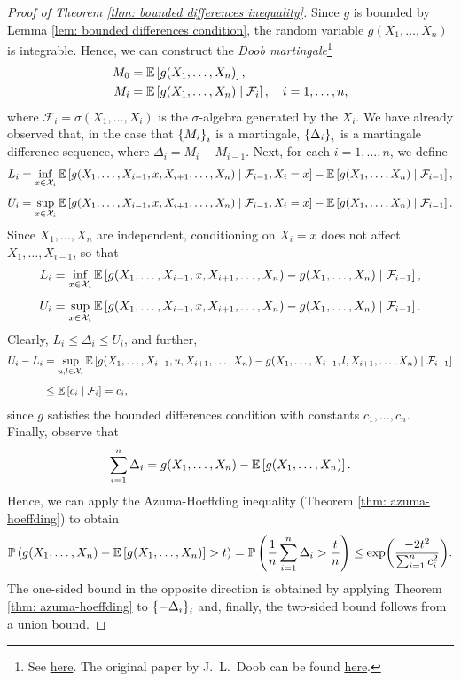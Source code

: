 \begin{proof}[Proof of Theorem \ref{thm: bounded differences inequality}]
Since $g$ is bounded by Lemma \ref{lem: bounded differences condition}, the random variable $g(X_1, \dots, X_n)$ is integrable. Hence, we can construct the \emph{Doob martingale}\footnote{See \href{https://en.wikipedia.org/wiki/Doob_martingale}{here}. The original paper by J.~L.~Doob can be found \href{https://www.ams.org/journals/tran/1940-047-03/S0002-9947-1940-0002052-6/S0002-9947-1940-0002052-6.pdf}{here}.}
\begin{align*}
    M_0 &= \mathbb{E}\left[g(X_1, \dots, X_n)\right], \\
    M_i &= \mathbb{E}\left[g(X_1, \dots, X_n) \mathrel{|} \mathcal{F}_i\right], \quad i = 1, \dots, n,
\end{align*}
where $\mathcal{F}_i = \sigma(X_1, \dots, X_i)$ is the $\sigma$-algebra generated by the $X_i$. We have already observed that, in the case that $\left\{M_i\right\}_i$ is a martingale, $\left\{\Delta_i\right\}_i$ is a martingale difference sequence, where $\Delta_i = M_i - M_{i-1}$. Next, for each $i = 1, \dots, n$, we define
\begin{align*}
    L_i &= \inf_{x \in \mathcal{X}_i} \mathbb{E}\left[g(X_1, \dots, X_{i-1}, x, X_{i+1}, \dots, X_n) \mathrel{|} \mathcal{F}_{i-1}, X_i = x\right] - \mathbb{E}\left[g(X_1, \dots, X_n) \mathrel{|} \mathcal{F}_{i-1}\right], \\[4pt]
    U_i &= \sup_{x \in \mathcal{X}_i} \mathbb{E}\left[g(X_1, \dots, X_{i-1}, x, X_{i+1}, \dots, X_n) \mathrel{|} \mathcal{F}_{i-1}, X_i = x\right] - \mathbb{E}\left[g(X_1, \dots, X_n) \mathrel{|} \mathcal{F}_{i-1}\right].
\end{align*}
Since $X_1, \dots, X_n$ are independent, conditioning on $X_i = x$ does not affect $X_1, \dots, X_{i-1}$, so that
\begin{align*}
    L_i &= \inf_{x \in \mathcal{X}_i} \mathbb{E}\left[g(X_1, \dots, X_{i-1}, x, X_{i+1}, \dots, X_n) - g(X_1, \dots, X_n) \mathrel{|} \mathcal{F}_{i-1}\right], \\[4pt]
    U_i &= \sup_{x \in \mathcal{X}_i} \mathbb{E}\left[g(X_1, \dots, X_{i-1}, x, X_{i+1}, \dots, X_n) - g(X_1, \dots, X_n) \mathrel{|} \mathcal{F}_{i-1}\right].
\end{align*}
Clearly, $L_i \leq \Delta_i \leq U_i$, and further,
\begin{align*}
    U_i - L_i &= \sup_{u, l \in \mathcal{X}_i} \mathbb{E}\left[g(X_1, \dots, X_{i-1}, u, X_{i+1}, \dots, X_n) - g(X_1, \dots, X_{i-1}, l, X_{i+1}, \dots, X_n) \mathrel{|} \mathcal{F}_{i-1}\right] \\[4pt]
        &\leq \mathbb{E}\left[c_i \mathrel{|} \mathcal{F}_i\right] = c_i,
\end{align*}
since $g$ satisfies the bounded differences condition with constants $c_1, \dots, c_n$. Finally, observe that
\[
    \sum_{i=1}^n \Delta_i = g(X_1, \dots, X_n) - \mathbb{E}\left[g(X_1, \dots, X_n)\right].
\]
Hence, we can apply the Azuma-Hoeffding inequality (Theorem \ref{thm: azuma-hoeffding}) to obtain
\[
    \mathbb{P}\left(g(X_1, \dots, X_n) - \mathbb{E}\left[g(X_1, \dots, X_n)\right] > t\right) = \mathbb{P}\left(\frac{1}{n}\sum_{i=1}^n \Delta_i > \frac{t}{n}\right) \leq \exp(\frac{-2t^2}{\sum_{i=1}^n c_i^2}).
\]
The one-sided bound in the opposite direction is obtained by applying Theorem \ref{thm: azuma-hoeffding} to $\left\{-\Delta_i\right\}_i$ and, finally, the two-sided bound follows from a union bound.
\end{proof}

